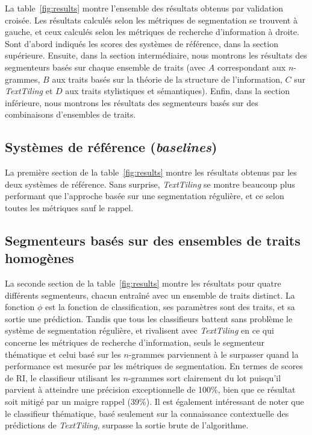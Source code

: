 La table~\ref{fig:results} montre l'ensemble des résultats obtenus par validation croisée. Les résultats calculés selon les métriques de segmentation se trouvent à gauche, et ceux calculés selon les métriques de recherche d'information à droite. Sont d'abord indiqués les scores des systèmes de référence, dans la section supérieure. Ensuite, dans la section intermédiaire, nous montrons les résultats des segmenteurs basés sur chaque ensemble de traits (avec $A$ correspondant aux $n$-grammes, $B$ aux traits basés sur la théorie de la structure de l'information, $C$ sur \textit{TextTiling} et $D$ aux traits stylistiques et sémantiques). Enfin, dans la section inférieure, nous montrons les résultats des segmenteurs basés sur des combinaisons d'ensembles de traits.

\subsection{Systèmes de référence (\textit{baselines})}

La première section de la table~\ref{fig:results} montre les résultats obtenus par les deux systèmes de référence. Sans surprise, \textit{TextTiling} se montre beaucoup plus performant que l'approche basée sur une segmentation régulière, et ce selon toutes les métriques sauf le rappel.

\subsection{Segmenteurs basés sur des ensembles de traits homogènes}

La seconde section de la table~\ref{fig:results} montre les résultats pour quatre différents segmenteurs, chacun entraîné avec un ensemble de traits distinct. La fonction $\phi$ est la fonction de classification, ses paramètres sont des traits, et sa sortie une prédiction. Tandis que tous les classifieurs battent sans problème le système de segmentation régulière, et rivalisent avec \textit{TextTiling} en ce qui concerne les métriques de recherche d'information, seuls le segmenteur thématique et celui basé sur les $n$-grammes parviennent à le surpasser quand la performance est mesurée par les métriques de segmentation. En termes de scores de RI, le classifieur utilisant les $n$-grammes sort clairement du lot puisqu'il parvient à atteindre une précision exceptionnelle de 100\%, bien que ce résultat soit mitigé par un maigre rappel (39\%). Il est également intéressant de noter que le classifieur thématique, basé seulement sur la connaissance contextuelle des prédictions de \textit{TextTiling}, surpasse la sortie brute de l'algorithme. 

